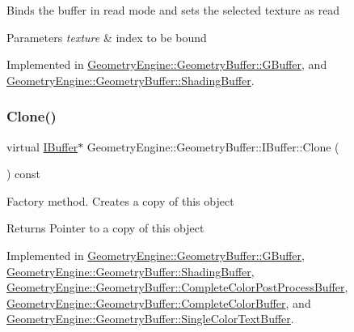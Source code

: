 Binds the buffer in read mode and sets the selected texture as read 
\begin{DoxyParams}{Parameters}
{\em texture} & index to be bound \\
\hline
\end{DoxyParams}


Implemented in \mbox{\hyperlink{class_geometry_engine_1_1_geometry_buffer_1_1_g_buffer_a40c1b8f341429f061a381ba98574ea82}{Geometry\+Engine\+::\+Geometry\+Buffer\+::\+G\+Buffer}}, and \mbox{\hyperlink{class_geometry_engine_1_1_geometry_buffer_1_1_shading_buffer_afe933c5c15ed7e488f5094ef2ddf8c4b}{Geometry\+Engine\+::\+Geometry\+Buffer\+::\+Shading\+Buffer}}.

\mbox{\label{class_geometry_engine_1_1_geometry_buffer_1_1_i_buffer_a41cb28df27adaea0555afd41169aebd6}} 
\subsubsection{\texorpdfstring{Clone()}{Clone()}}
{\footnotesize\ttfamily virtual \mbox{\hyperlink{class_geometry_engine_1_1_geometry_buffer_1_1_i_buffer}{I\+Buffer}}$\ast$ Geometry\+Engine\+::\+Geometry\+Buffer\+::\+I\+Buffer\+::\+Clone (\begin{DoxyParamCaption}{ }\end{DoxyParamCaption}) const\hspace{0.3cm}{\ttfamily [pure virtual]}}

Factory method. Creates a copy of this object \begin{DoxyReturn}{Returns}
Pointer to a copy of this object 
\end{DoxyReturn}


Implemented in \mbox{\hyperlink{class_geometry_engine_1_1_geometry_buffer_1_1_g_buffer_af993f8c23f7e78051f3071be4873af9d}{Geometry\+Engine\+::\+Geometry\+Buffer\+::\+G\+Buffer}}, \mbox{\hyperlink{class_geometry_engine_1_1_geometry_buffer_1_1_shading_buffer_a608f7a6fbde69056a268fac83caecfab}{Geometry\+Engine\+::\+Geometry\+Buffer\+::\+Shading\+Buffer}}, \mbox{\hyperlink{class_geometry_engine_1_1_geometry_buffer_1_1_complete_color_post_process_buffer_a8a484d5196bba7b92f31e500229743bc}{Geometry\+Engine\+::\+Geometry\+Buffer\+::\+Complete\+Color\+Post\+Process\+Buffer}}, \mbox{\hyperlink{class_geometry_engine_1_1_geometry_buffer_1_1_complete_color_buffer_a56aee74c7523f0b16fd8b97c8c44f84f}{Geometry\+Engine\+::\+Geometry\+Buffer\+::\+Complete\+Color\+Buffer}}, and \mbox{\hyperlink{class_geometry_engine_1_1_geometry_buffer_1_1_single_color_text_buffer_add00c2857f9d425600ef83d50a9c8019}{Geometry\+Engine\+::\+Geometry\+Buffer\+::\+Single\+Color\+Text\+Buffer}}.

